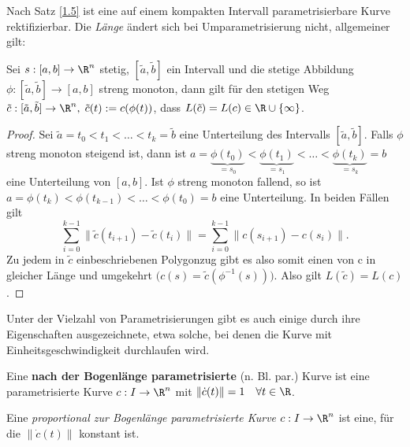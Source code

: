 \documentclass{mycourse}
\begin{document}
Nach Satz \ref{1.5} ist eine auf einem kompakten Intervall parametrisierbare Kurve rektifizierbar. Die \emph{Länge} ändert sich bei Umparametrisierung nicht, allgemeiner gilt:
\begin{st}
Sei $s: [a,b] \to \R^n$ stetig, $[\tilde a, \tilde b]$ ein Intervall und die stetige Abbildung $\phi: [\tilde a, \tilde b] \to [a,b]$ streng monoton, dann gilt für den stetigen Weg $\tilde c: [\tilde a, \tilde b] \to \R^n, \; \tilde c(t) := c(\phi(t))$, dass $L(\tilde c) = L(c) \in \R \cup \{ \infty \}$.
\begin{proof}
Sei $\tilde a = t_0 < t_1 < \dots < t_k = \tilde b$ eine Unterteilung des Intervalls $[\tilde a, \tilde b]$. Falls $\phi$ streng monoton steigend ist, dann ist $a =\underbrace{\phi(t_0)}_{ = s_0} <\underbrace{\phi( t_1)}_{ = s_1} < \dots < \underbrace{\phi(t_k)}_{ = s_k} = b$ eine Unterteilung von $[a,b]$. Ist $\phi$ streng monoton fallend, so ist $a = \phi(t_k) < \phi(t_{k-1}) < \dots < \phi(t_0) = b$ eine Unterteilung. In beiden Fällen gilt 
\[
\sum_{i=0}^{k-1} \| \tilde c(t_{i+1}) - \tilde c(t_i) \| = \sum_{i=0}^{k-1} \| c(s_{i+1}) - c(s_i)\|.
\]
Zu jedem in $\tilde c$ einbeschriebenen Polygonzug gibt es also somit einen von c in gleicher Länge und umgekehrt $\big ( c(s) = \tilde c(\phi^{-1}(s)) \big)$. Also gilt $L(\tilde c) = L(c)$.
\end{proof}
\end{st}

Unter der Vielzahl von Parametrisierungen gibt es auch einige durch ihre Eigenschaften ausgezeichnete, etwa solche, bei denen die Kurve mit Einheitsgeschwindigkeit durchlaufen wird.

\begin{df}
Eine \textbf{nach der Bogenlänge parametrisierte} (n. Bl. par.) Kurve ist eine parametrisierte Kurve $c:I \to \R^n$ mit $\| \dot c(t) \| = 1 \quad \forall t \in \R$.
\begin{note}
Eine \emph{proportional zur Bogenlänge parametrisierte Kurve} $c:I \to \R^n$ ist eine, für die $\| \dot c(t) \|$ konstant ist.
\end{note}
\end{df}
\end{document}
